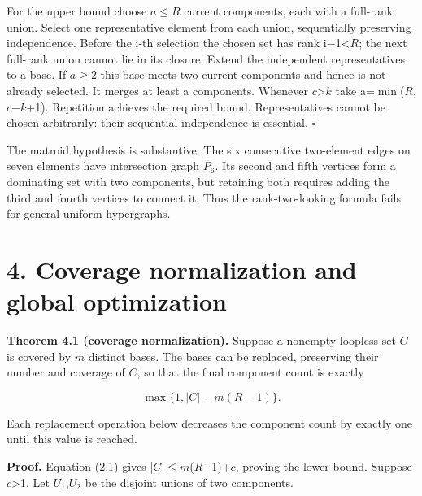 \documentclass[11pt]{article}
\begin{document}
For the upper bound choose \(a\le R\) current components, each with a full-rank union. Select one representative element from each union, sequentially preserving independence. Before the i-th selection the chosen set has rank i\ensuremath{-}1<\(R\); the next full-rank union cannot lie in its closure. Extend the independent representatives to a base. If \(a\ge2\) this base meets two current components and hence is not already selected. It merges at least a components. Whenever \(c\)>\(k\) take a=\(\min\)(\(R\),\(c\)\ensuremath{-}\(k\)+1). Repetition achieves the required bound. Representatives cannot be chosen arbitrarily: their sequential independence is essential. \hfill\ensuremath{\square}

The matroid hypothesis is substantive. The six consecutive two-element edges on seven elements have intersection graph \(P_6\). Its second and fifth vertices form a dominating set with two components, but retaining both requires adding the third and fourth vertices to connect it. Thus the rank-two-looking formula fails for general uniform hypergraphs.

\section*{4. Coverage normalization and global optimization}

\textbf{Theorem 4.1 (coverage normalization).} Suppose a nonempty loopless set \(C\) is covered by \(m\) distinct bases. The bases can be replaced, preserving their number and coverage of \(C\), so that the final component count is exactly

\[
\max\{1,|C|-m(R-1)\}.                             \tag{4.1}
\]

Each replacement operation below decreases the component count by exactly one until this value is reached.

\textbf{Proof.} Equation (2.1) gives |\(C\)|\(\le\)\(m\)(\(R\)\ensuremath{-}1)+\(c\), proving the lower bound. Suppose \(c\)>1. Let \(U_1\),\(U_2\) be the disjoint unions of two components.
\end{document}
